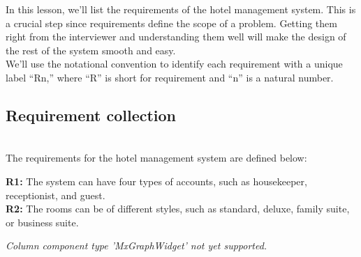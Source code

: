 

In this lesson, we'll list the requirements of the hotel management system. This is a crucial step since requirements define the scope of a problem. Getting them right from the interviewer and understanding them well will make the design of the rest of the system smooth and easy.
\\
We'll use the notational convention to identify each requirement with a unique label ``Rn,'' where ``R'' is short for requirement and ``n'' is a natural number.

\subsection{Requirement collection}\label{fQb8klvFMFLorujF7hz7w}
\\
The requirements for the hotel management system are defined below:

\noindent
\begin{minipage}[t]{0.48\textwidth}\vspace{0pt}
\textbf{R1:} The system can have four types of accounts, such as housekeeper, receptionist, and guest.
\\
\textbf{R2:} The rooms can be of different styles, such as standard, deluxe, family suite, or business suite.
\end{minipage}
\hfill
\begin{minipage}[t]{0.48\textwidth}\vspace{0pt}
\textit{Column component type 'MxGraphWidget' not yet supported.}
\end{minipage}

